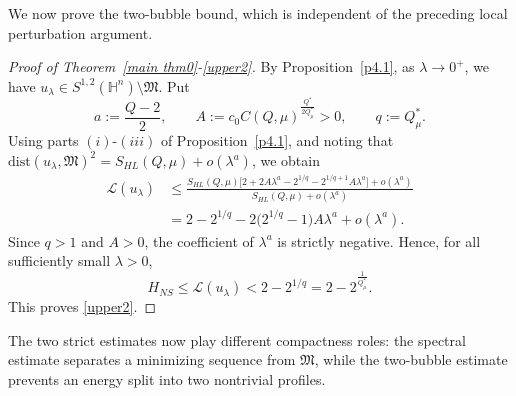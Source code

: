 \documentclass[10pt,a4paper]{amsart}
\begin{document}
{We now prove the two-bubble bound, which is independent of the preceding local perturbation argument.}
\begin{proof}
[Proof of Theorem~\ref{main thm0}-\eqref{upper2}]
{By Proposition~\ref{p4.1}, as $\lambda\to0^+$, we have $u_\lambda\in S^{1,2}(\mathbb H^n)\setminus\mathfrak M$. Put
\[
 a:=\frac{Q-2}{2},\qquad
 A:=c_0C(Q,\mu)^{\frac{Q^{\ast}}{2Q^{\ast}_{\mu}}}>0,
 \qquad q:=Q^{\ast}_{\mu}.
\]
Using parts $(i)$-$(iii)$ of Proposition~\ref{p4.1}, and noting that
$\mathrm{dist}(u_\lambda,\mathfrak M)^2=S_{HL}(Q,\mu)+o(\lambda^a)$, we obtain
\begin{align*}
 \mathcal L(u_\lambda)
 &\leq
 \frac{S_{HL}(Q,\mu)\big[2+2A\lambda^a-2^{1/q}-2^{1/q+1}A\lambda^a\big]
       +o(\lambda^a)}{S_{HL}(Q,\mu)+o(\lambda^a)}\\
 &=2-2^{1/q}-2\big(2^{1/q}-1\big)A\lambda^a+o(\lambda^a).
\end{align*}
Since $q>1$ and $A>0$, the coefficient of $\lambda^a$ is strictly negative. Hence, for all sufficiently small $\lambda>0$,
\[
 H_{NS}\leq\mathcal L(u_\lambda)<2-2^{1/q}
 =2-2^{\frac{1}{Q^{\ast}_{\mu}}}.
\]
This proves \eqref{upper2}.}
\end{proof}



The two strict estimates now play different compactness roles: the spectral estimate separates a minimizing sequence from $\mathfrak{M}$, while the two-bubble estimate prevents an energy split into two nontrivial profiles.
\end{document}

